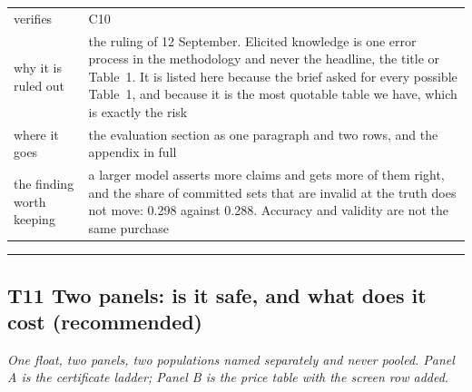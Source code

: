 \begin{center}\footnotesize
\begin{tabular}{@{}p{2.5cm}p{13.85cm}@{}}
\toprule
verifies & C10 \\
why it is ruled out & the ruling of 12 September. Elicited knowledge is one error process in the
methodology and never the headline, the title or Table~1. It is listed here because the brief asked
for every possible Table~1, and because it is the most quotable table we have, which is exactly the
risk \\
where it goes & the evaluation section as one paragraph and two rows, and the appendix in full \\
the finding worth keeping & a larger model asserts more claims and gets more of them right, and the
share of committed sets that are invalid at the truth does not move: 0.298 against 0.288. Accuracy
and validity are not the same purchase \\
\bottomrule
\end{tabular}
\end{center}

\vspace{6pt}
\hrule
\subsection*{T11 \quad Two panels: is it safe, and what does it cost \textnormal{(recommended)}}

\emph{One float, two panels, two populations named separately and never pooled. Panel A is the
certificate ladder; Panel B is the price table with the screen row added.}


